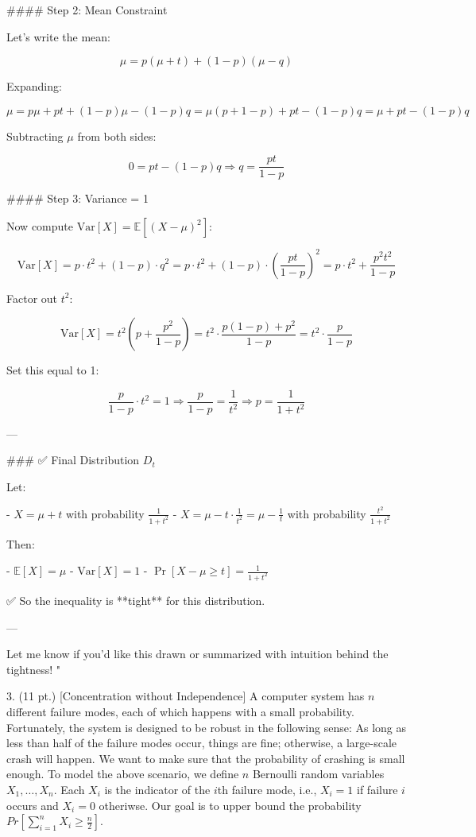#### Step 2: Mean Constraint

Let's write the mean:

\[
\mu = p(\mu + t) + (1 - p)(\mu - q)
\]

Expanding:

\[
\mu = p\mu + pt + (1 - p)\mu - (1 - p)q
= \mu (p + 1 - p) + pt - (1 - p)q
= \mu + pt - (1 - p)q
\]

Subtracting \( \mu \) from both sides:

\[
0 = pt - (1 - p)q \Rightarrow q = \frac{pt}{1 - p}
\]

#### Step 3: Variance = 1

Now compute \( \text{Var}[X] = \mathbb{E}[(X - \mu)^2] \):

\[
\text{Var}[X] = p \cdot t^2 + (1 - p) \cdot q^2
= p \cdot t^2 + (1 - p) \cdot \left( \frac{pt}{1 - p} \right)^2
= p \cdot t^2 + \frac{p^2 t^2}{1 - p}
\]

Factor out \( t^2 \):

\[
\text{Var}[X] = t^2 \left( p + \frac{p^2}{1 - p} \right)
= t^2 \cdot \frac{p(1 - p) + p^2}{1 - p}
= t^2 \cdot \frac{p}{1 - p}
\]

Set this equal to 1:

\[
\frac{p}{1 - p} \cdot t^2 = 1
\Rightarrow \frac{p}{1 - p} = \frac{1}{t^2}
\Rightarrow p = \frac{1}{1 + t^2}
\]

---

### ✅ Final Distribution \( D_t \)

Let:

- \( X = \mu + t \) with probability \( \frac{1}{1 + t^2} \)
- \( X = \mu - t \cdot \frac{1}{t^2} = \mu - \frac{1}{t} \) with probability \( \frac{t^2}{1 + t^2} \)

Then:

- \( \mathbb{E}[X] = \mu \)
- \( \text{Var}[X] = 1 \)
- \( \Pr[X - \mu \ge t] = \frac{1}{1 + t^2} \)

✅ So the inequality is **tight** for this distribution.

---

Let me know if you'd like this drawn or summarized with intuition behind the tightness!
"

3. (11 pt.) [Concentration without Independence]
A computer system has $n$ different failure modes, each of which happens with a small probability. Fortunately, the system is designed to be robust in the following sense: As long as less than half of the failure modes occur, things are fine; otherwise, a large-scale crash will happen. We want to make sure that the probability of crashing is small enough. To model the above scenario, we define $n$ Bernoulli random variables $X_1, \dots, X_n$. Each $X_i$ is the indicator of the $i$th failure mode, i.e., $X_i = 1$ if failure $i$ occurs and $X_i = 0$ otheriwse. Our goal is to upper bound the probability $Pr [\sum_{i=1}^n X_i \ge \frac{n}{2}]$.


